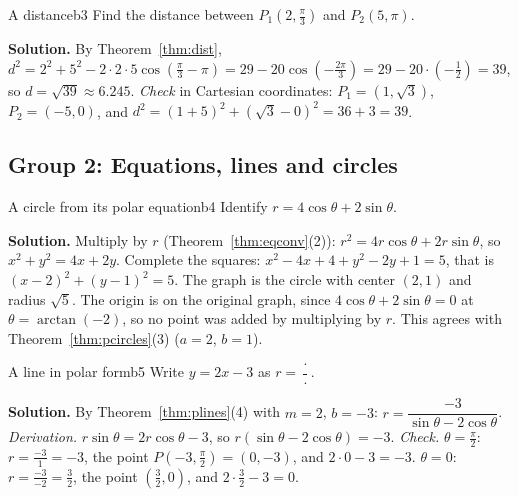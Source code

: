 \documentclass[11pt]{article}
\begin{document}
\begin{exmp}{A distance}{b3}
Find the distance between $P_1\left(2,\frac\pi3\right)$ and $P_2(5,\pi)$.

\textbf{Solution.} By Theorem~\ref{thm:dist}, $d^2=2^2+5^2-2\cdot2\cdot5\cos\left(\frac\pi3-\pi\right)=29-20\cos\left(-\frac{2\pi}3\right)=29-20\cdot\left(-\frac12\right)=39$, so $d=\sqrt{39}\approx6.245$. \emph{Check} in Cartesian coordinates: $P_1=(1,\sqrt3)$, $P_2=(-5,0)$, and $d^2=(1+5)^2+(\sqrt3-0)^2=36+3=39$.
\end{exmp}

\subsection*{Group 2: Equations, lines and circles}

\begin{exmp}{A circle from its polar equation}{b4}
Identify $r=4\cos\theta+2\sin\theta$.

\textbf{Solution.} Multiply by $r$ (Theorem~\ref{thm:eqconv}(2)): $r^2=4r\cos\theta+2r\sin\theta$, so $x^2+y^2=4x+2y$. Complete the squares: $x^2-4x+4+y^2-2y+1=5$, that is $(x-2)^2+(y-1)^2=5$. The graph is the circle with center $(2,1)$ and radius $\sqrt5$. The origin is on the original graph, since $4\cos\theta+2\sin\theta=0$ at $\theta=\arctan(-2)$, so no point was added by multiplying by $r$. This agrees with Theorem~\ref{thm:pcircles}(3) ($a=2$, $b=1$).
\end{exmp}

\begin{exmp}{A line in polar form}{b5}
Write $y=2x-3$ as $r=\dfrac{\cdot}{\cdot}$.

\textbf{Solution.} By Theorem~\ref{thm:plines}(4) with $m=2$, $b=-3$: $r=\dfrac{-3}{\sin\theta-2\cos\theta}$. \emph{Derivation.} $r\sin\theta=2r\cos\theta-3$, so $r(\sin\theta-2\cos\theta)=-3$. \emph{Check.} $\theta=\frac\pi2$: $r=\frac{-3}{1}=-3$, the point $P\left(-3,\frac\pi2\right)=(0,-3)$, and $2\cdot0-3=-3$. $\theta=0$: $r=\frac{-3}{-2}=\frac32$, the point $\left(\frac32,0\right)$, and $2\cdot\frac32-3=0$.
\end{exmp}
\end{document}
